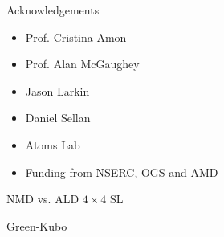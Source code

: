 \documentclass{beamer}
\begin{document}

\begin{frame}{Acknowledgements}
\begin{itemize}
\item Prof. Cristina Amon
\item Prof. Alan McGaughey
\item Jason Larkin
\item Daniel Sellan
\item Atoms Lab
\item Funding from NSERC, OGS and AMD
\end{itemize}
\end{frame}


\begin{frame}{NMD vs. ALD $4 \times 4$ SL}
\begin{figure}[t]
\begin{center}
\vspace*{-0.8cm}
\renewcommand{\figure}{Fig.}
\label{fig:NMD_v_ALD_sl}
\end{center}
\end{figure}
\end{frame}


\begin{frame}{Green-Kubo}
\begin{figure}[t]
\begin{center}
\vspace*{-0.8cm}
\renewcommand{\figure}{Fig.}
\label{fig:GK_bulk}
\end{center}
\end{figure}
\end{frame}


\end{document}
